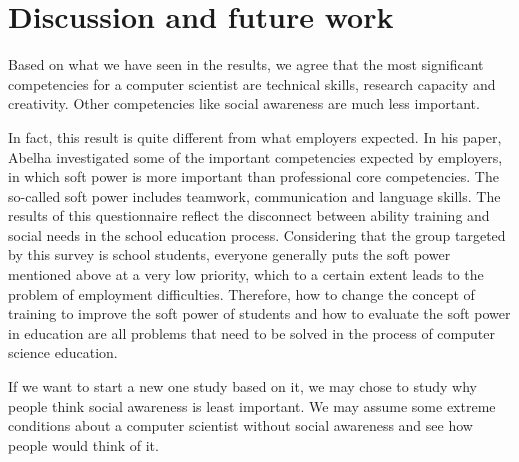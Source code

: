 \documentclass[conference]{IEEEtran}
\begin{document}
\section{Discussion and future work}
\par Based on what we have seen in the results, we agree that the most significant competencies for a computer scientist are technical skills, research capacity and creativity. Other competencies like social awareness are much less important.
\par In fact, this result is quite different from what employers expected. In his paper, Abelha\cite{b1} investigated some of the important competencies expected by employers, in which soft power is more important than professional core competencies. The so-called soft power includes teamwork, communication and language skills. The results of this questionnaire reflect the disconnect between ability training and social needs in the school education process. Considering that the group targeted by this survey is school students, everyone generally puts the soft power mentioned above at a very low priority, which to a certain extent leads to the problem of employment difficulties. Therefore, how to change the concept of training to improve the soft power of students and how to evaluate the soft power in education are all problems that need to be solved in the process of computer science education.
\par If we want to start a new one study based on it, we may chose to study why people think social awareness is least important. We may assume some extreme conditions about a computer scientist without social awareness and see how people would think of it.





\end{document}
